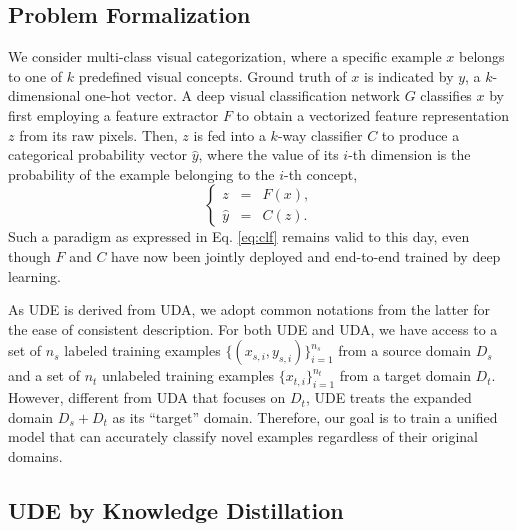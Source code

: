 
        
\subsection{Problem Formalization}


We consider multi-class visual categorization, where a specific example $x$ belongs to one of $k$ predefined visual concepts. Ground truth of $x$ is indicated by $y$, a $k$-dimensional one-hot vector. A deep visual classification network $G$ classifies $x$ by first employing a feature extractor $F$ to obtain a vectorized feature representation $z$ from its raw pixels. Then, $z$ is fed into a $k$-way classifier $C$ to produce a categorical probability vector $\hat{y}$, where the value of its $i$-th dimension is the probability of the example belonging to the $i$-th concept, \ie
\begin{equation} \label{eq:clf}
\left\{
\begin{array}{lll}
z & = & F(x), \\
\hat{y} & = & C(z).
\end{array} \right.
\end{equation}
Such a paradigm as expressed in Eq. \ref{eq:clf} remains valid to this day, even though $F$ and $C$ have now been jointly deployed and end-to-end trained by deep learning.



As UDE is derived from UDA, we adopt common notations from the latter for the ease of consistent description. 
For both UDE and UDA, we have access to a set of $n_s$ labeled training examples $\{(x_{s,i}, y_{s,i})\}_{i=1}^{n_s}$ from a source domain $D_s$ and a set of $n_t$ unlabeled training examples $\{x_{t,i}\}_{i=1}^{n_t}$ from a target domain $D_t$. However, different from UDA that focuses on $D_t$, UDE treats the expanded domain $D_s + D_t$ as its ``target'' domain. Therefore, our goal is to train a unified model that can accurately classify novel examples regardless of their original domains.









\subsection{UDE by Knowledge Distillation} \label{ssec:kdde_model}


